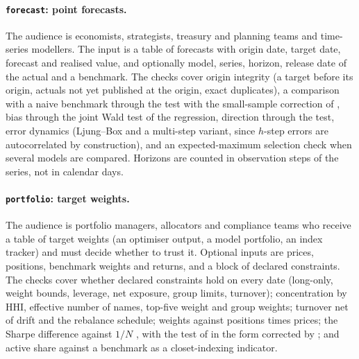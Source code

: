 \documentclass[11pt]{article}
\begin{document}
\paragraph{\texttt{forecast}: point forecasts.} The audience is economists, strategists, treasury and planning teams and time-series modellers. The input is a table of forecasts with origin date, target date, forecast and realised value, and optionally model, series, horizon, release date of the actual and a benchmark. The checks cover origin integrity (a target before its origin, actuals not yet published at the origin, exact duplicates), a comparison with a naive benchmark through the \citet{DieboldMariano1995} test with the small-sample correction of \citet{HarveyLeybourneNewbold1997}, bias through the joint Wald test of the \citet{MincerZarnowitz1969} regression, direction through the \citet{PesaranTimmermann1992} test, error dynamics (Ljung--Box and a multi-step variant, since $h$-step errors are autocorrelated by construction), and an expected-maximum selection check when several models are compared. Horizons are counted in observation steps of the series, not in calendar days.

\paragraph{\texttt{portfolio}: target weights.} The audience is portfolio managers, allocators and compliance teams who receive a table of target weights (an optimiser output, a model portfolio, an index tracker) and must decide whether to trust it. Optional inputs are prices, positions, benchmark weights and returns, and a block of declared constraints. The checks cover whether declared constraints hold on every date (long-only, weight bounds, leverage, net exposure, group limits, turnover); concentration by HHI, effective number of names, top-five weight and group weights; turnover net of drift and the rebalance schedule; weights against positions times prices; the Sharpe difference against $1/N$ \citep{DeMiguelGarlappiUppal2009}, with the test of \citet{JobsonKorkie1981} in the form corrected by \citet{Memmel2003}; and active share against a benchmark \citep{CremersPetajisto2009} as a closet-indexing indicator.
\end{document}
